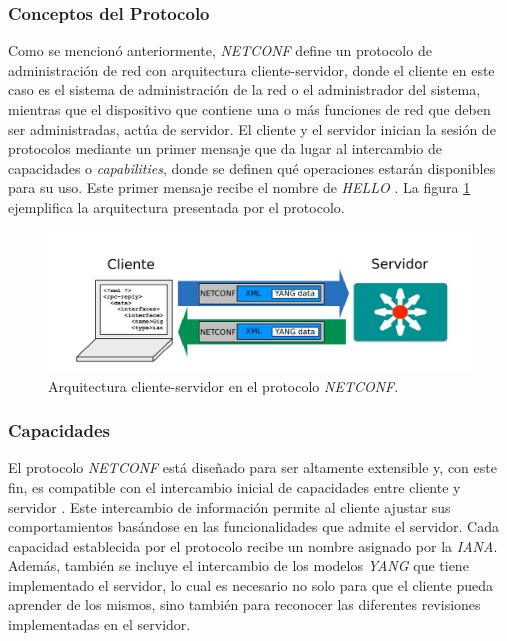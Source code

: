\subsubsection{Conceptos del Protocolo}
Como se mencionó anteriormente, \textit{NETCONF} define un protocolo de administración de red con arquitectura cliente-servidor, donde el cliente en este caso es el sistema de administración de la red o el administrador del sistema, mientras que el dispositivo que contiene una o más funciones de red que deben ser administradas, actúa de servidor. El cliente y el servidor inician la sesión de protocolos mediante un primer mensaje que da lugar al intercambio de capacidades o \textit{capabilities}, donde se definen qué operaciones estarán disponibles para su uso. Este primer mensaje recibe el nombre de \textit{HELLO} \parencite{netconfrfcnuevo}. La figura \ref{fig:netconf_comunicacion} ejemplifica la arquitectura presentada por el protocolo.

\begin{figure}[htbp]
	\centering
	\includegraphics[scale=0.77]{Figures/netconf-cliente-servidor.pdf}
	\caption{Arquitectura cliente-servidor en el protocolo \textit{NETCONF}.}
	\label{fig:netconf_comunicacion}
  \end{figure}

  \subsubsection{Capacidades}
  El protocolo \textit{NETCONF} está diseñado para ser altamente extensible y, con este fin, es compatible con el intercambio inicial de capacidades entre cliente y servidor \parencite{netconfrfcnuevo}. Este intercambio de información permite al cliente ajustar sus comportamientos basándose en las funcionalidades que admite el servidor. Cada capacidad establecida por el protocolo recibe un nombre asignado por la \textit{IANA}. Además, también se incluye el intercambio de los modelos \textit{YANG} que tiene implementado el servidor, lo cual es necesario no solo para que el cliente pueda aprender de los mismos, sino también para reconocer las diferentes revisiones implementadas en el servidor. 
  \\
  
